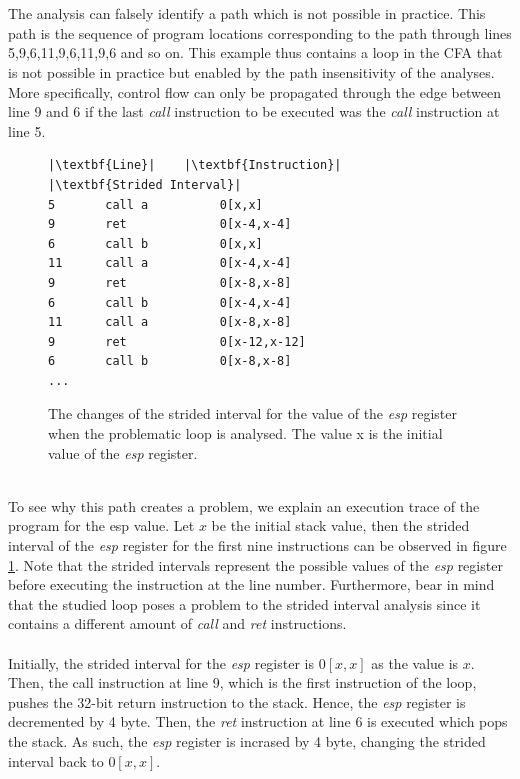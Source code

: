 \documentclass{kththesis}
\renewcommand{\it}[1]{\textit{#1}}
\begin{document}
\\ \\
The analysis can falsely identify a path which is not possible in practice. This path is the sequence of program locations corresponding to the path through lines 5,9,6,11,9,6,11,9,6 and so on. This example thus contains a loop in the CFA that is not possible in practice but enabled by the path insensitivity of the analyses. More specifically, control flow can only be propagated through the edge between line 9 and 6 if the last \it{call} instruction to be executed was the \it{call} instruction at line 5.
\begin{figure}[!ht]
    \centering
\begin{tcolorbox}
\begin{verbatim}
|\textbf{Line}|    |\textbf{Instruction}|     |\textbf{Strided Interval}|
5       call a          0[x,x]
9       ret             0[x-4,x-4]
6       call b          0[x,x]
11      call a          0[x-4,x-4]
9       ret             0[x-8,x-8]
6       call b          0[x-4,x-4]
11      call a          0[x-8,x-8]
9       ret             0[x-12,x-12]
6       call b          0[x-8,x-8]
...
\end{verbatim}
\end{tcolorbox}
\caption[The changes of the strided interval for the value of the \it{esp} register when the problematic loop is analysed.]{The changes of the strided interval for the value of the \it{esp} register when the problematic loop is analysed. The value x is the initial value of the \it{esp} register.}
    \label{fig:badLoopTrace}
\end{figure}
\noindent
\\
To see why this path creates a problem, we explain an execution trace of the program for the esp value. Let $x$ be the initial stack value, then the strided interval of the \it{esp} register for the first nine instructions can be observed in figure \ref{fig:badLoopTrace}. Note that the strided intervals represent the possible values of the \it{esp} register before executing the instruction at the line number. Furthermore, bear in mind that the studied loop poses a problem to the strided interval analysis since it contains a different amount of \it{call} and \it{ret} instructions.
\\ \\
Initially, the strided interval for the \it{esp} register is $0[x,x]$ as the value is $x$. Then, the call instruction at line 9, which is the first instruction of the loop, pushes the 32-bit return instruction to the stack. Hence, the \it{esp} register is decremented by 4 byte. Then, the \it{ret} instruction at line 6 is executed which pops the stack. As such, the \it{esp} register is incrased by 4 byte, changing the strided interval back to $0[x,x]$. 
\end{document}
